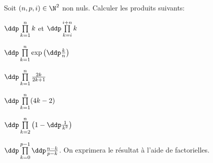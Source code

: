 
\begin{exercice}  \; 
Soit $(n,p,i)\in\N^2$ non nuls. Calculer les produits suivants:
\begin{enumerate}
\begin{minipage}[t]{0.3\textwidth}
\item $\ddp \prod\limits_{k=1}^n k$ \; et \; $\ddp \prod\limits_{k=i}^{i+n} k$
\item $\ddp \prod\limits_{k=1}^n \exp{\left(\ddp\frac{k}{n}\right)}$ 
\item $\ddp \prod\limits_{k=1}^n \frac{2k}{2k+1}$ 
\end{minipage}
\begin{minipage}[t]{0.6\textwidth}
\item $\ddp \prod\limits_{k=1}^n (4k-2)$ 
\item $\ddp \prod\limits_{k=2}^n \left(  1-\ddp\frac{1}{k^2} \right)$
\item $\ddp \prod\limits_{k=0}^{p-1} \ddp\frac{n-k}{p-k}$. On exprimera le r\'esultat \`{a} l'aide de factorielles.
\end{minipage}
\end{enumerate}
\end{exercice}